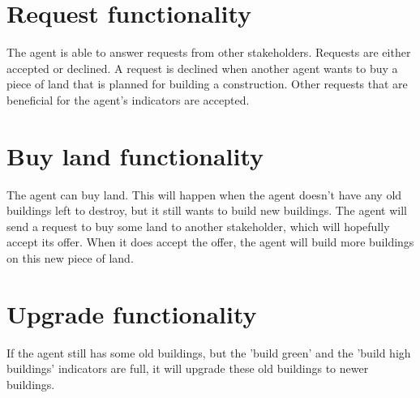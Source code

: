 \section{Request functionality}
The agent is able to answer requests from other stakeholders. Requests are either accepted or declined. A request is declined when another agent wants to buy a piece of land that is planned for building a construction. Other requests that are beneficial for the agent’s indicators are accepted.

\section{Buy land functionality}
The agent can buy land. This will happen when the agent doesn't have any old buildings left to destroy, but it still wants to build new buildings. The agent will send a request to buy some land to another stakeholder, which will hopefully accept its offer. When it does accept the offer, the agent will build more buildings on this new piece of land.

\section{Upgrade functionality}
If the agent still has some old buildings, but the 'build green' and the 'build high buildings' indicators are full, it will upgrade these old buildings to newer buildings.
